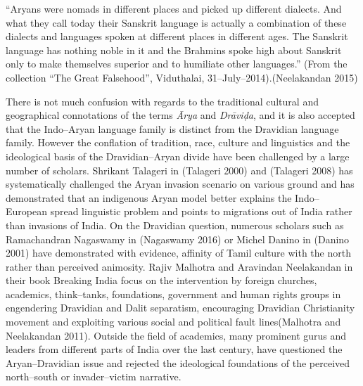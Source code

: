 \begin{myquote}
“Aryans were nomads in different places and picked up different dialects. And what they call today their Sanskrit language is actually a combination of these dialects and languages spoken at different places in different ages. The Sanskrit language has nothing noble in it and the Brahmins spoke high about Sanskrit only to make themselves superior and to humiliate other languages.” (From the collection “The Great Falsehood”, Viduthalai, 31–July–2014).(Neelakandan 2015)
\end{myquote}

There is not much confusion with regards to the traditional cultural and geographical connotations of the terms \textit{Ārya} and \textit{Drāviḍa}, and it is also accepted that the Indo–Aryan language family is distinct from the Dravidian language family. However the conflation of tradition, race, culture and linguistics and the ideological basis of the Dravidian–Aryan divide have been challenged by a large number of scholars. Shrikant Talageri in (Talageri 2000) and (Talageri 2008) has systematically challenged the Aryan invasion scenario on various ground and has demonstrated that an indigenous Aryan model better explains the Indo–European spread linguistic problem and points to migrations out of India rather than invasions of India. On the Dravidian question, numerous scholars such as Ramachandran Nagaswamy in (Nagaswamy 2016) or Michel Danino in (Danino 2001) have demonstrated with evidence, affinity of Tamil culture with the north rather than perceived animosity. Rajiv Malhotra and Aravindan Neelakandan in their book Breaking India focus on the intervention by foreign churches, academics, think–tanks, foundations, government and human rights groups in engendering Dravidian and Dalit separatism, encouraging Dravidian Christianity movement and exploiting various social and political fault lines(Malhotra and Neelakandan 2011). Outside the field of academics, many prominent gurus and leaders from different parts of India over the last century, have questioned the Aryan–Dravidian issue and rejected the ideological foundations of the perceived north–south or invader–victim narrative.

\newpage

